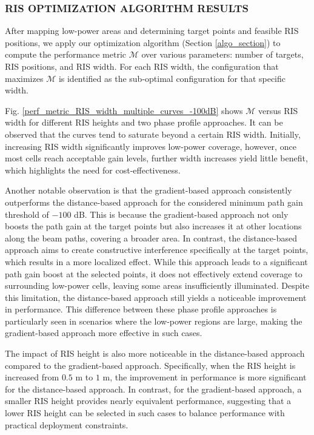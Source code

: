 \documentclass{IEEEoj}
\begin{document}
\subsubsection{RIS OPTIMIZATION ALGORITHM RESULTS}
After mapping low-power areas and determining target points and feasible RIS positions, we apply our optimization algorithm (Section \ref{algo_section}) to compute the performance metric $\mathcal{M}$ over various parameters: number of targets, RIS positions, and RIS width. For each RIS width, the configuration that maximizes $\mathcal{M}$ is identified as the sub-optimal configuration for that specific width.

Fig. \ref{perf_metric_RIS_width_multiple_curves_-100dB} shows $\mathcal{M}$ versus RIS width for different RIS heights and two phase profile approaches. It can be observed that the curves tend to saturate beyond a certain RIS width. Initially, increasing RIS width significantly improves low-power coverage, however, once most cells reach acceptable gain levels, further width increases yield little benefit, which highlights the need for cost-effectiveness.

Another notable observation is that the gradient-based approach consistently outperforms the distance-based approach for the considered minimum path gain threshold of $-100$ dB. This is because the gradient-based approach not only boosts the path gain at the target points but also increases it at other locations along the beam paths, covering a broader area. In contrast, the distance-based approach aims to create constructive interference specifically at the target points, which results in a more localized effect. While this approach leads to a significant path gain boost at the selected points, it does not effectively extend coverage to surrounding low-power cells, leaving some areas insufficiently illuminated. Despite this limitation, the distance-based approach still yields a noticeable improvement in performance. This difference between these phase profile approaches is particularly seen in scenarios where the low-power regions are large, making the gradient-based approach more effective in such cases.

The impact of RIS height is also more noticeable in the distance-based approach compared to the gradient-based approach. Specifically, when the RIS height is increased from $0.5$ m to $1$ m, the improvement in performance is more significant for the distance-based approach. In contrast, for the gradient-based approach, a smaller RIS height provides nearly equivalent performance, suggesting that a lower RIS height can be selected in such cases to balance performance with practical deployment constraints.
\end{document}
